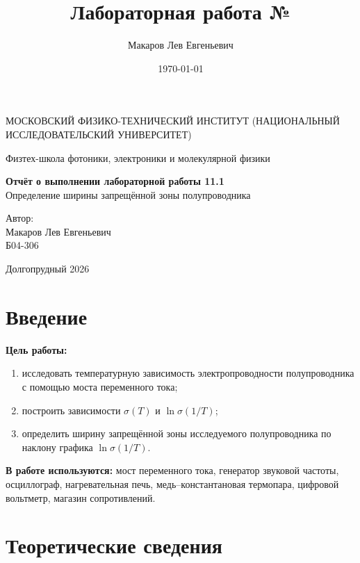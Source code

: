 \documentclass[a4paper,12pt]{article}
\author{Макаров Лев Евгеньевич}
\title{Лабораторная работа №\labnumber\\\labname}
\date{\today}
\newcommand\labname{Определение ширины запрещённой зоны полупроводника}
\newcommand\labnumber{11.1}
\begin{document}
\begin{titlepage}
    \begin{center}
        {\large МОСКОВСКИЙ ФИЗИКО-ТЕХНИЧЕСКИЙ ИНСТИТУТ (НАЦИОНАЛЬНЫЙ ИССЛЕДОВАТЕЛЬСКИЙ УНИВЕРСИТЕТ)}
    \end{center}
    \begin{center}
        {\large Физтех-школа фотоники, электроники и молекулярной физики}
    \end{center}

    \vspace{4.5cm}
    {\huge
        \begin{center}
            {\bf Отчёт о выполнении лабораторной работы \labnumber}\\
            \labname
        \end{center}
    }
    \vspace{2cm}
    \begin{flushright}
        {\LARGE Автор:\\ Макаров Лев Евгеньевич\\
        \vspace{0.2cm}
        Б04-306}
    \end{flushright}
    \vspace{8cm}
    \begin{center}
        Долгопрудный 2026
    \end{center}
\end{titlepage}

\section{Введение}

\textbf{Цель работы:}
\begin{enumerate}
    \item исследовать температурную зависимость электропроводности полупроводника с помощью моста переменного тока;
    \item построить зависимости $\sigma(T)$ и $\ln \sigma(1/T)$;
    \item определить ширину запрещённой зоны исследуемого полупроводника по наклону графика $\ln \sigma(1/T)$.
\end{enumerate}

\textbf{В работе используются:} мост переменного тока, генератор звуковой частоты, осциллограф, нагревательная печь, медь--константановая термопара, цифровой вольтметр, магазин сопротивлений.

\section{Теоретические сведения}
\end{document}
